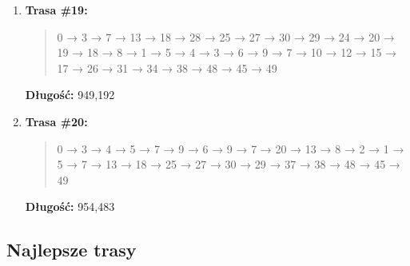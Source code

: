 \documentclass{article}
\begin{document}
\begin{enumerate}
    \item \textbf{Trasa \#19:}
    \begin{quote}
        0 → 3 → 7 → 13 → 18 → 28 → 25 → 27 → 30 → 29 → 24 → 20 → 19 → 18 → 8 → 1 → 5 → 4 → 3 → 6 → 9 → 7 → 10 → 12 → 15 → 17 → 26 → 31 → 34 → 38 → 48 → 45 → 49
    \end{quote}
    \textbf{Długość:} 949{,}192

    \item \textbf{Trasa \#20:}
    \begin{quote}
        0 → 3 → 4 → 5 → 7 → 9 → 6 → 9 → 7 → 20 → 13 → 8 → 2 → 1 → 5 → 7 → 13 → 18 → 25 → 27 → 30 → 29 → 37 → 38 → 48 → 45 → 49
    \end{quote}
    \textbf{Długość:} 954{,}483

\end{enumerate}

\subsection*{Najlepsze trasy}
\end{document}
